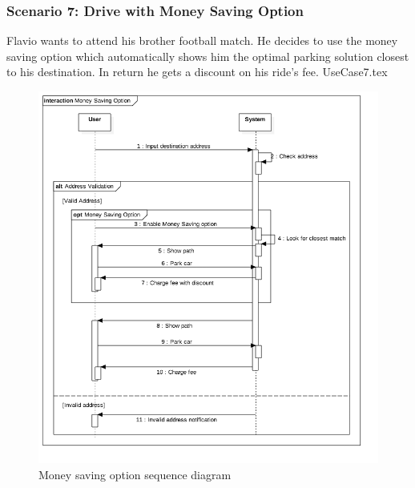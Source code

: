 \documentclass[12pt]{article}
\begin{document}
		\subsubsection{Scenario 7: Drive with Money Saving Option}
		Flavio wants to attend his brother football match. He decides to use the money saving 
		option which automatically shows him the optimal parking solution closest to his destination.
		In return he gets a discount on his ride's fee.
		\FloatBarrier
		{UseCase7.tex}
		\newpage
		\begin{figure}[htbp]
		\caption{Money saving option sequence diagram}
		\includegraphics[scale=0.49]{Images/SequenceDiagram/MSO.png}
 	 	\end{figure}
 	 	\clearpage
		
\end{document}
